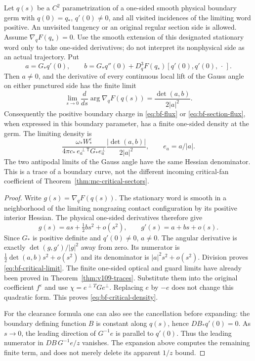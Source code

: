 \begin{theorem}
\label{thm:bf-critical-cancellation}
Let $q(s)$ be a $C^2$ parametrization of a one-sided smooth physical
boundary germ with $q(0)=q_*$, $q'(0)\ne0$, and all visited
incidences of the limiting word positive.  An unvisited tangency or an
original regular section side is allowed.  Assume $\nabla_qF(q_*)=0$.
Use the smooth extension of this designated stationary word only to
take one-sided derivatives; do not interpret its nonphysical side as
an actual trajectory.  Put
\[
 a=G_*q'(0),\qquad
 b=G_*q''(0)+D_q^3F(q_*)[q'(0),q'(0),\,\cdot\,].
\]
Then $a\ne0$, and the derivative of every continuous local lift of
the Gauss angle on either punctured side has the finite limit
\begin{equation}\label{eq:bf-critical-limit}
 \lim_{s\to0}\frac{d}{ds}\arg\nabla_qF(q(s))
       =\frac{\det(a,b)}{2|a|^2}.
\end{equation}
Consequently the positive boundary charge in
\eqref{eq:bf-flux} or \eqref{eq:bf-section-flux}, when expressed in
this boundary parameter, has a finite one-sided density at the germ.
The limiting density is
\begin{equation}\label{eq:bf-critical-density}
 \frac{\omega_*W_*^\varepsilon}
 {4\pi c_*\,e_a^{\perp\mathsf T}G_*e_a^\perp}
          \frac{|\det(a,b)|}{2|a|^2},\qquad e_a=a/|a|.
\end{equation}
The two antipodal limits of the Gauss angle have the same Hessian
denominator.  This is a trace of a boundary curve, not the different
incoming critical-fan coefficient of
Theorem~\ref{thm:mc-critical-sectors}.
\end{theorem}
\begin{proof}
Write $g(s)=\nabla_qF(q(s))$.  The stationary word is smooth in a
neighborhood of the limiting nongrazing contact configuration by its
positive interior Hessian.  The physical one-sided derivatives
therefore give
\[
 g(s)=as+\tfrac12bs^2+o(s^2),\qquad
 g'(s)=a+bs+o(s).
\]
Since $G_*$ is positive definite and $q'(0)\ne0$, $a\ne0$.
The angular derivative is exactly $\det(g,g')/|g|^2$ away from zero.
Its numerator is $\tfrac12\det(a,b)s^2+o(s^2)$ and its denominator
is $|a|^2s^2+o(s^2)$.  Division proves
\eqref{eq:bf-critical-limit}.  The finite one-sided optical and
guard limits have already been proved in Theorem~\ref{thm:v109-traces}.
Substitute them into the original coefficient $f^\varepsilon$ and
use $\chi=e^{\perp T}Ge^\perp$.  Replacing $e$ by $-e$ does not
change this quadratic form.  This proves
\eqref{eq:bf-critical-density}.

For the clearance formula one can also see the cancellation before
expanding: the boundary defining function $B$ is constant along
$q(s)$, hence $DB_*q'(0)=0$.  As $s\to0$, the leading direction of
$G^{-1}e$ is parallel to $q'(0)$.  Thus the leading numerator in
$DB\,G^{-1}e/z$ vanishes.  The expansion above computes the remaining
finite term, and does not merely delete its apparent $1/z$ bound.
\end{proof}


